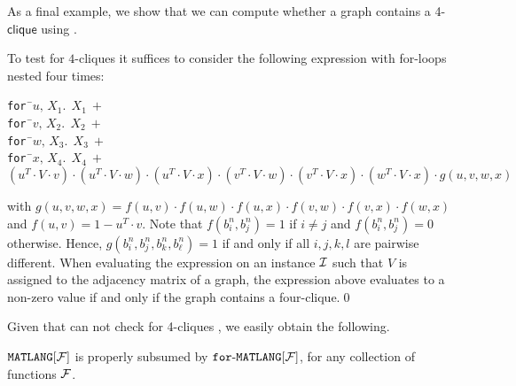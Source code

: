 As a final example, we show that we can compute whether a graph contains a 4-$\textsf{clique}$ using \langfor.
\begin{example}\label{ex:fourcliques}
To test for $4$-cliques it suffices to consider the following expression with for-loops nested four times:
\begin{center}
\parbox{0cm}{
\begin{tabbing}
\texttt{for\,}\=$u,\,X_1.\ \ X_1 \ + $\\
\> \texttt{for\,}\=$v,\,X_2.\ \ X_2 \ +$ \\
\>\>\texttt{for\,}\=$w,\,X_3.\ \ X_3 \ +$ \\
\>\>\>\texttt{for\,}\=$x,\,X_4.\ \ X_4 \ +$ \\
\>\>\>\>$(u^T\!\cdot\! V\!\cdot\! v) \!\cdot\! (u^T\!\cdot\! V\!\cdot\! w)\!\cdot\! (u^T\!\cdot\! V\!\cdot\! x) \!\cdot\! (v^T\!\cdot\! V\!\cdot\! w) \!\cdot\! (v^T\!\cdot\! V\!\cdot\! x)\!\cdot\! (w^T\!\cdot\! V\!\cdot\! x) \!\cdot\! g(u,v,w,x)$
\end{tabbing}
}
\end{center}
with $g(u,v,w,x)=f(u,v)\cdot f(u,w)\cdot f(u,x)\cdot f(v,w)\cdot f(v,x)\cdot f(w,x)$ and
$f(u,v)=1-u^T\cdot v$. Note that $f(b_i^n,b_j^n)=1$ if $i\neq j$ and $f(b_i^n,b_j^n)=0$ otherwise.
Hence, $g(b_i^n,b_j^n,b_k^n,b_\ell^n)=1$ if and only if all $i,j,k,l$ are pairwise different.
When evaluating the expression on an instance $\mathcal{I}$ such that $V$ is assigned to the adjacency 
matrix of a graph, the expression above evaluates to a non-zero value if and only if the graph
contains a four-clique.\qed
\end{example}

Given that \lang can not check for 4-cliques \cite{matlang-journal}, we easily obtain the following.

\begin{proposition}
\label{cor-ml-fml}
$\texttt{MATLANG}[\mathcal{F}]$ is properly subsumed by $\texttt{for}\text{-}\texttt{MATLANG}[\mathcal{F}]$, for any collection of functions $\mathcal{F}$.
\end{proposition} 

%
%

